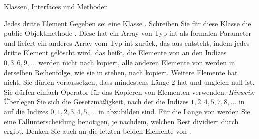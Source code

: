 \documentclass{../preamble}
\begin{document}
\begin{task}[credit = \stars{3}{3}]{Klassen, Interfaces und Methoden}
    \begin{solution}
        
    \end{solution}
\end{task}

\clearpage

\begin{task}[credit = \stars{3}{3}]{Jedes dritte Element}
    Gegeben sei eine Klasse . Schreiben Sie für diese Klasse die \textcolor{keywordcolor}{public}-Objektmethode . Diese hat ein Array  von Typ \textcolor{keywordcolor}{int} als formalen Parameter und liefert ein anderes Array   vom  Typ \textcolor{keywordcolor}{int} zurück, das aus   entsteht, indem jedes dritte Element gelöscht wird, das heißt, die Elemente von  an den Indizes \(0, 3, 6, 9, ...\) werden nicht nach  kopiert, alle anderen Elemente von  werden in derselben Reihenfolge, wie sie in  stehen, nach  kopiert. Weitere Elemente hat  nicht. Sie dürfen voraussetzen, dass  mindestens Länge \(2\) hat und ungleich \textcolor{keywordcolor}{null} ist. Sie dürfen einfach Operator \code{=} für das Kopieren von Elementen verwenden.
    \br
    \textit{Hinweis:} Überlegen Sie sich die Gesetzmäßigkeit, nach der die Indizes \(1, 2, 4, 5, 7, 8, ...\) in  auf die Indizes \(0, 1, 2, 3, 4, 5, ...\) in  abzubilden sind. Für die Länge von  werden Sie eine Fallunterscheidung benötigen, je nachdem, welchen Rest  dividiert durch  ergibt. Denken Sie auch an die letzten beiden Elemente von .

    \begin{solution}
        
    \end{solution}
\end{task}
\end{document}
